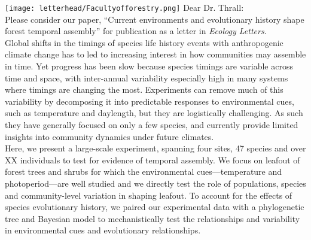 \documentclass[11pt,a4paper]{article}
\begin{document}

\noindent \texttt{[image: letterhead/Facultyofforestry.png]}
\noindent Dear Dr. Thrall:
\vspace{1.5ex}\\
\noindent Please consider our paper, ``Current environments and evolutionary history shape forest temporal assembly'' for publication as a letter in \emph{Ecology Letters}. 
\vspace{1.5ex}\\ 
Global shifts in the timings of species life history events with anthropogenic climate change has to led to increasing interest in how communities may assemble in time. Yet progress has been slow because species timings are variable across time and space, with inter-annual variability especially high in many systems where timings are changing the most. Experiments can remove much of this variability by decomposing it into predictable responses to environmental cues, such as temperature and daylength, but they are logistically challenging. As such they have generally focused on only a few species, and currently provide limited insights into community dynamics under future climates. 
\vspace{1.5ex}\\
\noindent 
Here, we present a large-scale experiment, spanning four sites, 47 species and over XX individuals to test for evidence of temporal assembly.  We focus on leafout of forest trees and shrubs for which the environmental cues---temperature and photoperiod---are well studied and we directly test the role of populations, species and community-level variation in shaping leafout. To account for the effects of species evolutionary history, we paired our experimental data with a phylogenetic tree and Bayesian model to mechanistically test the relationships and variability in environmental cues and evolutionary relationships.
\end{document}
